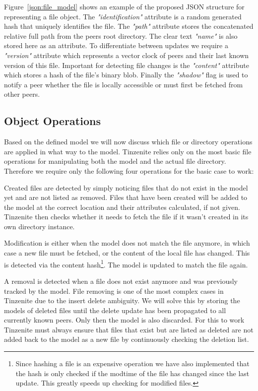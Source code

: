 Figure~\ref{json:file_model} shows an example of the proposed JSON structure for representing a file object.
The \textit{"identification"} attribute is a random generated hash that uniquely identifies the file.
The \textit{"path"} attribute stores the concatenated relative full path from the peers root directory.
The clear text \textit{"name"} is also stored here as an attribute.
To differentiate between updates we require a \textit{"version"} attribute which represents a vector clock of peers and their last known version of this file.
Important for detecting file changes is the \textit{"content"} attribute which stores a hash of the file's binary blob.
Finally the \textit{"shadow"} flag is used to notify a peer whether the file is locally accessible or must first be fetched from other peers.

\subsection{Object Operations}
\label{sub:Object Operations}

Based on the defined model we will now discuss which file or directory operations are applied in what way to the model.
Tinzenite relies only on the most basic file operations for manipulating both the model and the actual file directory.
Therefore we require only the following four operations for the basic case to work:

\begin{description}[leftmargin=5em,style=nextline,noitemsep,nolistsep]
    \item[Create]
        Created files are detected by simply noticing files that do not exist in the model yet and are not listed as removed.
        Files that have been created will be added to the model at the correct location and their attributes calculated, if not given.
        Tinzenite then checks whether it needs to fetch the file if it wasn't created in its own directory instance.
    \item[Modify]
        Modification is either when the model does not match the file anymore, in which case a new file must be fetched, or the content of the local file has changed.
        This is detected via the content hash\footnote{Since hashing a file is an expensive operation we have also implemented that the hash is only checked if the modtime of the file has changed since the last update. This greatly speeds up checking for modified files.}.
        The model is updated to match the file again.
    \item[Remove]
        A removal is detected when a file does not exist anymore and was previously tracked by the model.
        File removing is one of the most complex cases in Tinzenite due to the insert delete ambiguity.
        We will solve this by storing the models of deleted files until the delete update has been propagated to all currently known peers.
        Only then the model is also discarded.
        For this to work Tinzenite must always ensure that files that exist but are listed as deleted are not added back to the model as a new file by continuously checking the deletion list.
\end{description}

